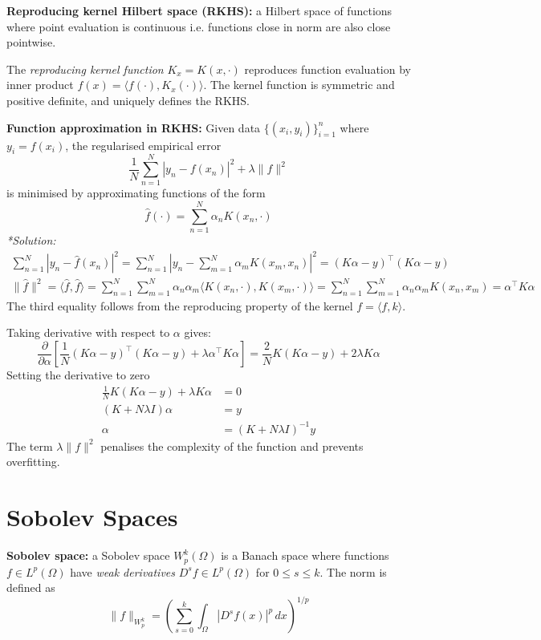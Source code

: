 \documentclass[12pt]{article}
\begin{document}
\textbf{Reproducing kernel Hilbert space (RKHS):} a Hilbert space of functions where point evaluation is continuous i.e. functions close in norm are also close pointwise.

The \textit{reproducing kernel function} $K_x = K(x, \cdot)$ reproduces function evaluation by inner product $f(x) = \langle f(\cdot), K_x(\cdot) \rangle$. The kernel function is symmetric and positive definite, and uniquely defines the RKHS.

\textbf{Function approximation in RKHS:} Given data $\{(x_i, y_i)\}_{i=1}^n$ where $y_i = f(x_i)$, the regularised empirical error
$$
\frac{1}{N}\sum_{n=1}^N |y_n - f(x_n)|^2 + \lambda \|f\|^2
$$
is minimised by approximating functions of the form
$$\hat{f}(\cdot) = \sum_{n=1}^N \alpha_n K(x_n, \cdot)$$
\textit{*Solution:}
\begin{align*}
\sum_{n=1}^N |y_n - \hat{f}(x_n)|^2 = \sum_{n=1}^N \left|y_n - \sum_{m=1}^N \alpha_m K(x_m, x_n)\right|^2 = (K\alpha - y)^\top (K\alpha - y) \\
\|\hat{f}\|^2 = \langle \hat{f}, \hat{f} \rangle = \sum_{n=1}^N \sum_{m=1}^N \alpha_n \alpha_m \langle K(x_n, \cdot), K(x_m, \cdot) \rangle = \sum_{n=1}^N \sum_{m=1}^N \alpha_n \alpha_m K(x_n, x_m) = \alpha^\top K \alpha
\end{align*}
The third equality follows from the reproducing property of the kernel $f = \langle f, k \rangle$.

Taking derivative with respect to $\alpha$ gives:
$$
\frac{\partial}{\partial \alpha} \left[ \frac{1}{N}(K\alpha - y)^\top (K\alpha - y) + \lambda \alpha^\top K \alpha \right] = \frac{2}{N} K(K\alpha - y) + 2\lambda K \alpha
$$
Setting the derivative to zero
\begin{align*}
\frac{1}{N} K(K\alpha - y) + \lambda K \alpha &= 0 \\
(K + N\lambda I) \alpha &= y \\
\alpha &= (K + N\lambda I)^{-1} y
\end{align*}
The term $\lambda \|f\|^2$ penalises the complexity of the function and prevents overfitting.

\section{Sobolev Spaces}
\textbf{Sobolev space:} a Sobolev space $W^k_p(\Omega)$ is a Banach space where functions $f \in L^p(\Omega)$ have \textit{weak derivatives} $D^s f \in L^p(\Omega)$ for $0 \leq s \leq k$. The norm is defined as
$$
\|f\|_{W^k_p} = \left( \sum_{s=0}^k \int_\Omega |D^s f(x)|^p \, dx \right)^{1/p}
$$
\end{document}

